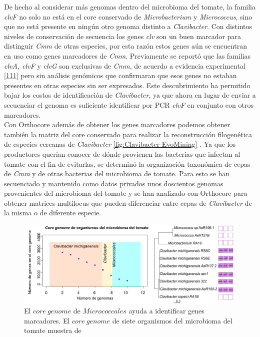 \documentclass[12pt,twoside]{reedthesis}
\begin{document}
  De hecho al considerar más genomas dentro del microbioma del tomate, la
  familia \emph{clvF} no solo no está en el core conservado de
  \emph{Microbacterium} y \emph{Micrococcus}, sino que no está presente en
  ningún otro genoma distinto a \emph{Clavibacter}. Con distintos niveles
  de conservación de secuencia los genes \emph{clv} son un buen marcador
  para distinguir \emph{Cmm} de otras especies, por esta razón estos genes
  aún se encuentran en uso como genes marcadores de \emph{Cmm}.
  Previamente se reportó que las familias \emph{clvA, clvF} y \emph{clvG}
  son exclusivas de \emph{Cmm}, de acuerdo a evidencia experimental
  {[}\protect\hyperlink{ref-yasuhara-bell_genes_2014}{111}{]} pero sin
  análisis genómicos que confirmaran que esos genes no estaban presentes
  en otras especies sin ser expresados. Este descubrimiento ha permitido
  bajar los costos de identificación de \emph{Clavibacter}, ya que ahora
  en lugar de enviar a secuenciar el genoma es suficiente identificar por
  PCR \emph{clvF} en conjunto con otros marcadores.\\
  Con Orthocore además de obtener los genes marcadores podemos obtener
  también la matriz del core conservado para realizar la reconstrucción
  filogenética de especies cercanas de \emph{Clavibacter}
  \autoref{fig:Clavibacter-EvoMining} . Ya que los productores querían
  conocer de dónde provienen las bacterias que infectan al tomate con el
  fin de evitarlas, se determinó la organización taxonómica de cepas de
  \emph{Cmm} y de otras bacterias del microbioma de tomate. Para esto se
  han secuenciado y mantenido como datos privados unos doscientos genomas
  provenientes del microbioma del tomate y se han analizado con Orthocore
  para obtener matrices multilocus que pueden diferenciar entre cepas de
  \emph{Clavibacter} de la misma o de diferente especie.
  
  \begin{figure}[h!tbp]
  \centering
  \includegraphics[angle = 0,scale = .7]{chapter1/CoreGenomeMicrobioma.pdf}
  \caption[El $core~genome$ de $Micrococcales$ ayuda a identificar genes marcadores ]{\footnotesize{El $core~genome$ de $Micrococcales$ ayuda a identificar genes marcadores. El $core~genome$ de siete organismos del microbioma del tomate muestra  de }}
  \label{fig:Clavibacter-EvoMining}
  \end{figure}
  
\end{document}
